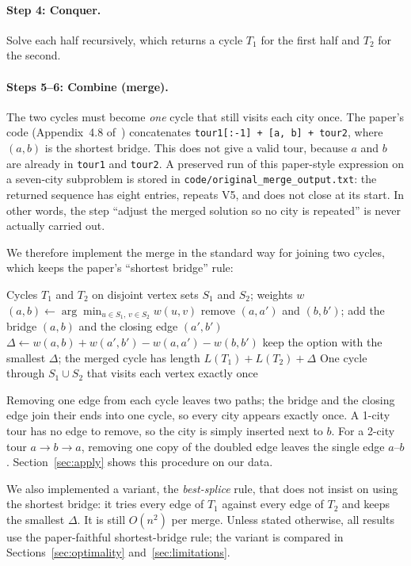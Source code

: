 \paragraph{Step 4: Conquer.} Solve each half recursively, which returns a cycle $T_1$ for the first half
and $T_2$ for the second.

\paragraph{Steps 5--6: Combine (merge).} The two cycles must become \emph{one} cycle that still visits
each city once. The paper's code (Appendix~4.8 of~\cite{lunagarcia2024performance}) concatenates
\texttt{tour1[:-1] + [a, b] + tour2}, where $(a,b)$ is the shortest bridge. This does not give a valid
tour, because $a$ and $b$ are already in \texttt{tour1} and \texttt{tour2}. A preserved run of this
paper-style expression on a seven-city subproblem is stored in
\texttt{code/original\_merge\_output.txt}: the returned sequence has eight entries, repeats V5, and
does not close at its start. In other words, the step ``adjust the merged solution so no city is repeated''
is never actually carried out.

We therefore implement the merge in the standard way for joining two cycles, which keeps the paper's
``shortest bridge'' rule:

\begin{algorithm}[H]
\caption{Merge two cycles through the shortest bridge (our implementation of Steps 5--6)}\label{alg:merge}
\begin{algorithmic}[1]
\Require Cycles $T_1$ and $T_2$ on disjoint vertex sets $S_1$ and $S_2$; weights $w$
\State $(a, b) \gets \arg\min_{u \in S_1,\, v \in S_2} w(u,v)$ 
  \State remove $(a,a')$ and $(b,b')$; add the bridge $(a,b)$ and the closing edge $(a',b')$
  \State $\Delta \gets w(a,b) + w(a',b') - w(a,a') - w(b,b')$
\EndFor
\State keep the option with the smallest $\Delta$; the merged cycle has length $L(T_1)+L(T_2)+\Delta$
\Ensure One cycle through $S_1 \cup S_2$ that visits each vertex exactly once
\end{algorithmic}
\end{algorithm}

Removing one edge from each cycle leaves two paths; the bridge and the closing edge join their ends into
one cycle, so every city appears exactly once. A 1-city tour has no edge to remove, so the city is simply
inserted next to $b$. For a 2-city tour $a \to b \to a$, removing one copy of the doubled edge leaves the
single edge $a$--$b$. Section~\ref{sec:apply} shows this procedure on our data.

\begin{remark}
We also implemented a variant, the \emph{best-splice} rule, that does not insist on using the shortest
bridge: it tries every edge of $T_1$ against every edge of $T_2$ and keeps the smallest $\Delta$. It is
still $O(n^2)$ per merge. Unless stated otherwise, all results use the paper-faithful shortest-bridge
rule; the variant is compared in Sections~\ref{sec:optimality} and~\ref{sec:limitations}.
\end{remark}
